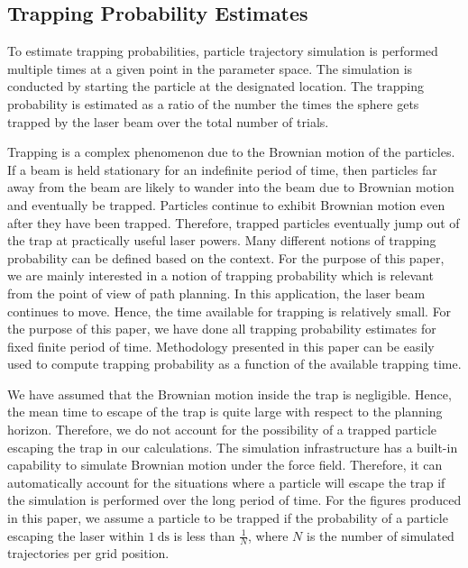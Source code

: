 \subsection{Trapping Probability Estimates}

To estimate trapping probabilities, particle trajectory simulation
is performed multiple times at a given point in the parameter
space. The simulation is conducted by starting the particle at the
designated location. The trapping probability is estimated as a ratio
of the number the times the sphere gets trapped by the laser beam over
the total number of trials.

Trapping is a complex phenomenon due to the Brownian motion of the
particles. If a beam is held stationary for an indefinite period of
time, then particles far away from the beam are likely to wander
into the beam due to Brownian motion and eventually be
trapped. Particles continue to exhibit Brownian motion even after they
have been trapped. Therefore, trapped particles eventually jump out of
the trap at practically useful laser powers.  Many different notions
of trapping probability can be defined based on the context. For the
purpose of this paper, we are mainly interested in a notion of
trapping probability which is relevant from the point of view of path
planning. In this application, the laser beam continues to
move. Hence, the time available for trapping is relatively small. For
the purpose of this paper, we have done all trapping probability
estimates for fixed finite period of time. Methodology presented in
this paper can be easily used to compute trapping probability as a
function of the available trapping time.

We have assumed that the Brownian motion inside the trap is
negligible. Hence, the mean time to escape of the trap is quite large
with respect to the planning horizon. Therefore, we do not account for
the possibility of a trapped particle escaping the trap in our
calculations.  The simulation infrastructure has a built-in capability
to simulate Brownian motion under the force field. Therefore, it can
automatically account for the situations where a particle will escape
the trap if the simulation is performed over the long period of time.
For the figures produced in this paper, we assume a particle to be
trapped if the probability of a particle escaping the laser within
$\SI{1}{\deci\second}$ is less than $\frac{1}{N}$, where $N$ is the
number of simulated trajectories per grid position.




